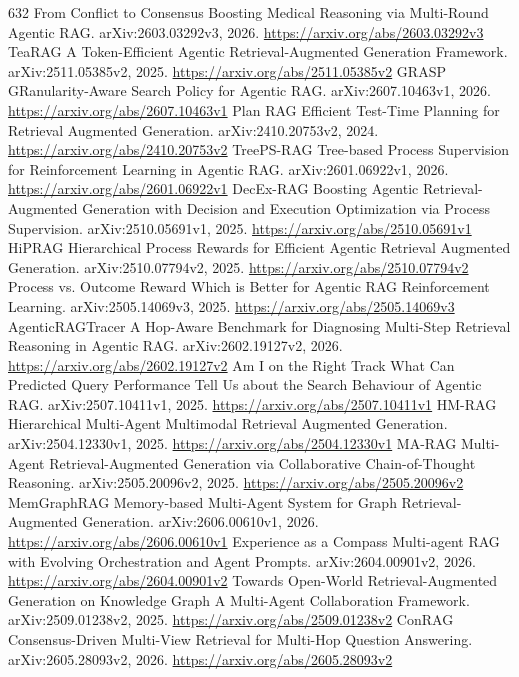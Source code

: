 \documentclass[11pt]{article}
\begin{document}
\begin{thebibliography}{632}
 From Conflict to Consensus Boosting Medical Reasoning via Multi-Round Agentic RAG. arXiv:2603.03292v3, 2026. \url{https://arxiv.org/abs/2603.03292v3}
 TeaRAG A Token-Efficient Agentic Retrieval-Augmented Generation Framework. arXiv:2511.05385v2, 2025. \url{https://arxiv.org/abs/2511.05385v2}
 GRASP GRanularity-Aware Search Policy for Agentic RAG. arXiv:2607.10463v1, 2026. \url{https://arxiv.org/abs/2607.10463v1}
 Plan RAG Efficient Test-Time Planning for Retrieval Augmented Generation. arXiv:2410.20753v2, 2024. \url{https://arxiv.org/abs/2410.20753v2}
 TreePS-RAG Tree-based Process Supervision for Reinforcement Learning in Agentic RAG. arXiv:2601.06922v1, 2026. \url{https://arxiv.org/abs/2601.06922v1}
 DecEx-RAG Boosting Agentic Retrieval-Augmented Generation with Decision and Execution Optimization via Process Supervision. arXiv:2510.05691v1, 2025. \url{https://arxiv.org/abs/2510.05691v1}
 HiPRAG Hierarchical Process Rewards for Efficient Agentic Retrieval Augmented Generation. arXiv:2510.07794v2, 2025. \url{https://arxiv.org/abs/2510.07794v2}
 Process vs. Outcome Reward Which is Better for Agentic RAG Reinforcement Learning. arXiv:2505.14069v3, 2025. \url{https://arxiv.org/abs/2505.14069v3}
 AgenticRAGTracer A Hop-Aware Benchmark for Diagnosing Multi-Step Retrieval Reasoning in Agentic RAG. arXiv:2602.19127v2, 2026. \url{https://arxiv.org/abs/2602.19127v2}
 Am I on the Right Track What Can Predicted Query Performance Tell Us about the Search Behaviour of Agentic RAG. arXiv:2507.10411v1, 2025. \url{https://arxiv.org/abs/2507.10411v1}
 HM-RAG Hierarchical Multi-Agent Multimodal Retrieval Augmented Generation. arXiv:2504.12330v1, 2025. \url{https://arxiv.org/abs/2504.12330v1}
 MA-RAG Multi-Agent Retrieval-Augmented Generation via Collaborative Chain-of-Thought Reasoning. arXiv:2505.20096v2, 2025. \url{https://arxiv.org/abs/2505.20096v2}
 MemGraphRAG Memory-based Multi-Agent System for Graph Retrieval-Augmented Generation. arXiv:2606.00610v1, 2026. \url{https://arxiv.org/abs/2606.00610v1}
 Experience as a Compass Multi-agent RAG with Evolving Orchestration and Agent Prompts. arXiv:2604.00901v2, 2026. \url{https://arxiv.org/abs/2604.00901v2}
 Towards Open-World Retrieval-Augmented Generation on Knowledge Graph A Multi-Agent Collaboration Framework. arXiv:2509.01238v2, 2025. \url{https://arxiv.org/abs/2509.01238v2}
 ConRAG Consensus-Driven Multi-View Retrieval for Multi-Hop Question Answering. arXiv:2605.28093v2, 2026. \url{https://arxiv.org/abs/2605.28093v2}

\end{thebibliography}
\end{document}
